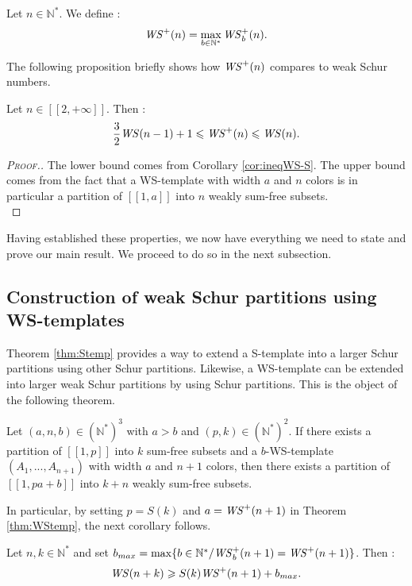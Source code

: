 \begin{definition}
Let \( n \in \mathbb{N}^*\). We define :
\[
\mathit{WS}^+(n)=\max_{b\in \mathbb{N}^*} \mathit{WS}_b^+(n).
\]
\end{definition}
The following proposition briefly shows how \(\mathit{WS}^+(n)\) compares to weak Schur numbers.
\begin{proposition}
Let \(n \in [\![2, +\infty]\!]\). Then :
\[
\frac{3}{2} \mathit{WS} (n-1)+1 \leqslant \mathit{WS}^+(n) \leqslant \mathit{WS} (n).
\]
\end{proposition}

\begin{proof}[\textsc{Proof.}]
The lower bound comes from Corollary \ref{cor:ineqWS-S}.
The upper bound comes from the fact that a WS-template with width \(a\) and \(n\) colors is in particular a partition of
\([\![1, a]\!]\) into \(n\) weakly sum-free subsets. \\
\end{proof}

Having established these properties, we now have everything we need to state and prove our main result. We proceed to do so
in the next subsection.

\subsection{Construction of weak Schur partitions using WS-templates}
\label{ConstructionWS}

Theorem \ref{thm:Stemp} provides a way to extend a S-template into a larger Schur partitions using other Schur partitions. Likewise, a WS-template can 
be extended into larger weak Schur partitions by using Schur partitions. This is the object of the following theorem.

\begin{theorem}
\label{thm:WStemp}
Let \((a,n,b) \in (\mathbb{N}^*)^3\) with \(a > b\) and \( (p,k) \in (\mathbb{N}^*)^2\). If there exists a partition of \([\![1,p]\!]\)
into \(k\) sum-free subsets and a \(b\)-WS-template \((A_1,...,A_{n+1})\) with width \(a\) and \(n+1\) colors,
then there exists a partition of \([\![1, p a + b]\!]\) into \(k+n\) weakly sum-free subsets.
\end{theorem}

In particular, by setting \(p = S(k)\) and \(a = \mathit{WS}^+(n + 1)\) in Theorem \ref{thm:WStemp}, the next corollary follows.

\begin{corollary}
\label{cor:ineqWS+}
Let \(n,k \in \mathbb{N}^*\) and set \( b_{max} = \max \{b\in \mathbb{N}^*/ \mathit{WS}_b^+(n+1) = \mathit{WS}^+(n+1)\}\).
Then :
\[
\mathit{WS}(n+k) \geqslant S(k) \mathit{WS}^+(n+1)+b_{max}.
\]
\end{corollary}

